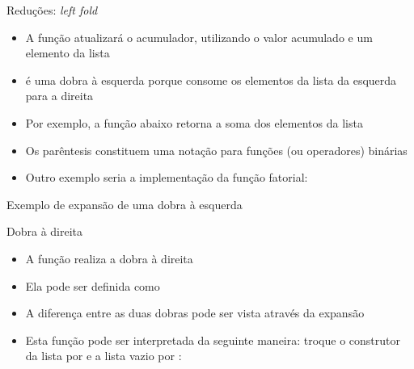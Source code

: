 \begin{frame}[fragile]{Reduções: {\it left fold}}

    \begin{itemize}
        \item A função  atualizará o acumulador, utilizando o valor acumulado
            e um elemento da lista

        \item {} é uma dobra à esquerda porque consome os elementos da lista
            da esquerda para a direita

        \item Por exemplo, a função  abaixo retorna a soma dos elementos
            da lista 


        \item Os parêntesis constituem uma notação para funções (ou operadores) binárias

        \item Outro exemplo seria a implementação da função fatorial:

    \end{itemize}

\end{frame}

\begin{frame}[fragile]{Exemplo de expansão de uma dobra à esquerda}
\end{frame}

\begin{frame}[fragile]{Dobra à direita}

    \begin{itemize}
        \item A função  realiza a dobra à direita

        \item Ela pode ser definida como


        \item A diferença entre as duas dobras pode ser vista através da expansão 


        \item Esta função pode ser interpretada da seguinte maneira: troque o construtor da
            lista por  e a lista vazio por :

    \end{itemize}

\end{frame}

